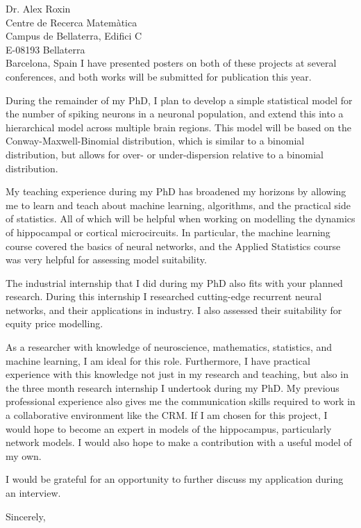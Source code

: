 \documentclass[11pt]{letter} %
\begin{document}
\begin{letter}{Dr. Alex Roxin \\
  Centre de Recerca Matem\`{a}tica \\
  Campus de Bellaterra, Edifici C \\
  E-08193 Bellaterra \\
  Barcelona, Spain}
  I have presented posters on both of these projects at several conferences, and both works will be submitted for publication this year.

  During the remainder of my PhD, I plan to develop a simple statistical model for the number of spiking neurons in a neuronal population, and extend this into a hierarchical model across multiple brain regions. This model will be based on the Conway-Maxwell-Binomial distribution, which is similar to a binomial distribution, but allows for over- or under-dispersion relative to a binomial distribution.

  My teaching experience during my PhD has broadened my horizons by allowing me to learn and teach about machine learning, algorithms, and the practical side of statistics. All of which will be helpful when working on modelling the dynamics of hippocampal or cortical microcircuits. In particular, the machine learning course covered the basics of neural networks, and the Applied Statistics course was very helpful for assessing model suitability.

  The industrial internship that I did during my PhD also fits with your planned research. During this internship I researched cutting-edge recurrent neural networks, and their applications in industry. I also assessed their suitability for equity price modelling.

  As a researcher with knowledge of neuroscience, mathematics, statistics, and machine learning, I am ideal for this role. Furthermore, I have practical experience with this knowledge not just in my research and teaching, but also in the three month research internship I undertook during my PhD. My previous professional experience also gives me the communication skills required to work in a collaborative environment like the CRM. If I am chosen for this project, I would hope to become an expert in models of the hippocampus, particularly network models. I would also hope to make a contribution with a useful model of my own.

  I would be grateful for an opportunity to further discuss my application during an interview.

  \vspace{2\parskip} %
  \closing{Sincerely,}
  \vspace{2\parskip} %




\end{letter}
\end{document}

